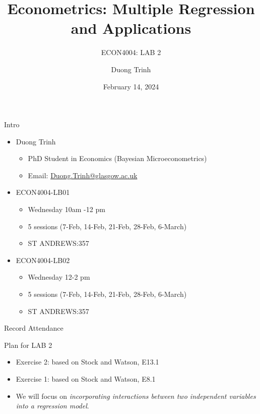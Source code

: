 \documentclass[
  10pt,
  ignorenonframetext,
]{beamer}
\title{Econometrics: Multiple Regression and Applications}
\subtitle{ECON4004: LAB 2}
\author{Duong Trinh}
\date{February 14, 2024}
\institute{University of Glasgow}
\providecommand{\tightlist}{%
  \setlength{\itemsep}{0pt}\setlength{\parskip}{0pt}}
\begin{document}
\frame{\titlepage}

\begin{frame}{Intro}
\protect\hypertarget{intro}{}
\begin{itemize}
\tightlist
\item
  Duong Trinh

  \begin{itemize}
  \tightlist
  \item
    PhD Student in Economics (Bayesian Microeconometrics)
  \item
    Email: \underline{Duong.Trinh@glasgow.ac.uk}
  \end{itemize}
\end{itemize}

\vspace{3mm}

\begin{itemize}
\tightlist
\item
  ECON4004-LB01

  \begin{itemize}
  \tightlist
  \item
    Wednesday 10am -12 pm
  \item
    5 sessions (7-Feb, 14-Feb, 21-Feb, 28-Feb, 6-March)
  \item
    ST ANDREWS:357
  \end{itemize}
\item
  ECON4004-LB02

  \begin{itemize}
  \tightlist
  \item
    Wednesday 12-2 pm
  \item
    5 sessions (7-Feb, 14-Feb, 21-Feb, 28-Feb, 6-March)
  \item
    ST ANDREWS:357
  \end{itemize}
\end{itemize}
\end{frame}

\begin{frame}{Record Attendance}
\protect\hypertarget{record-attendance}{}
\end{frame}

\begin{frame}{Plan for LAB 2}
\protect\hypertarget{plan-for-lab-2}{}
\begin{itemize}
\tightlist
\item
  Exercise 2: based on Stock and Watson, E13.1
\item
  Exercise 1: based on Stock and Watson, E8.1
\end{itemize}

\vspace{3mm}

\begin{itemize}
\tightlist
\item
  We will focus on \emph{incorporating interactions between two
  independent variables into a regression model}.
\end{itemize}
\end{frame}
\end{document}
